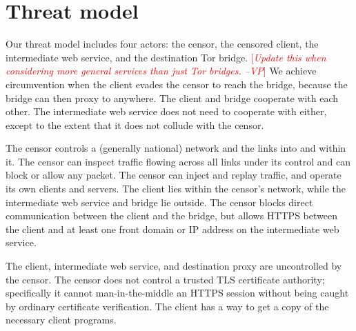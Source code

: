 \documentclass{sig-alternate}
\newcommand{\meek}{meek\xspace}
\newcommand{\note}[1]{{\textcolor{red}{[\textit{#1}]}}}
\newcommand{\vp}[1]{\note{#1 --VP}}
\begin{document}



\section{Threat model}

Our threat model includes four actors:
the censor,
the censored client,
the intermediate web service,
and the destination Tor bridge.
\vp{Update this when considering more general services than just
Tor bridges.}
We achieve
circumvention when the client evades the censor to reach
the bridge,
because the bridge can then proxy to anywhere.
The client and bridge cooperate with each other.
The intermediate web service does not need to cooperate with either,
except to the extent that it does not collude with the censor.

The censor controls a (generally national)
network and the links into and within it.
The censor can inspect traffic flowing across all links under its control
and can block or allow any packet.
The censor can inject and replay traffic, and
operate its own clients and servers.
The client lies within the censor's network,
while the intermediate web service and bridge lie outside.
The censor blocks direct communication between the client and the bridge,
but allows HTTPS between the client and at least one front domain or IP address
on the intermediate web service.


The client,
intermediate web service,
and destination proxy
are uncontrolled by the censor.
The censor does not control a trusted TLS certificate authority;
specifically it cannot man-in-the-middle an HTTPS session
without being caught by ordinary certificate verification.
The client has a way to get a copy of the necessary client programs.
\end{document}
